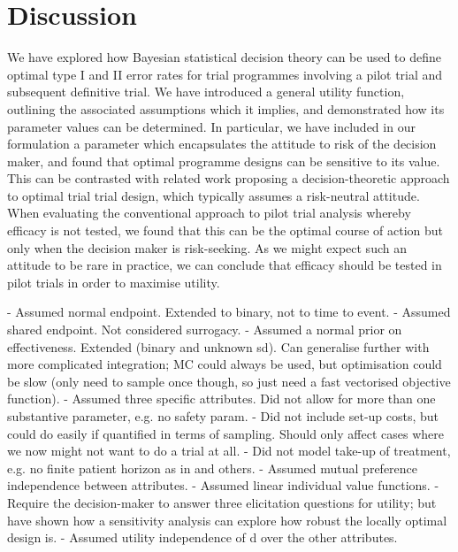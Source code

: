 \documentclass[sagev, Crown]{sagej}
\begin{document}

\section{Discussion}\label{sec:discussion}

We have explored how Bayesian statistical decision theory can be used to define optimal type I and II error rates for trial programmes involving a pilot trial and subsequent definitive trial. We have introduced a general utility function, outlining the associated assumptions which it implies, and demonstrated how its parameter values can be determined. In particular, we have included in our formulation a parameter which encapsulates the attitude to risk of the decision maker, and found that optimal programme designs can be sensitive to its value. This can be contrasted with related work proposing a decision-theoretic approach to optimal trial trial design, which typically assumes a risk-neutral attitude. When evaluating the conventional approach to pilot trial analysis whereby efficacy is not tested, we found that this can be the optimal course of action but only when the decision maker is risk-seeking. As we might expect such an attitude to be rare in practice, we can conclude that efficacy should be tested in pilot trials in order to maximise utility.

- Assumed normal endpoint. Extended to binary, not to time to event.
- Assumed shared endpoint. Not considered surrogacy.
- Assumed a normal prior on effectiveness. Extended (binary and unknown sd). Can generalise further with more complicated integration; MC could always be used, but optimisation could be slow (only need to sample once though, so just need a fast vectorised objective function).
- Assumed three specific attributes.  Did not allow for more than one substantive parameter, e.g. no safety param. 
- Did not include set-up costs, but could do easily if quantified in terms of sampling. Should only affect cases where we now might not want to do a trial at all.
- Did not model take-up of treatment, e.g. no finite patient horizon as in \cite{Pearce2018} and others. 
- Assumed mutual preference independence between attributes. 
- Assumed linear individual value functions.
- Require the decision-maker to answer three elicitation questions for utility; but have shown how a sensitivity analysis can explore how robust the locally optimal design is.
- Assumed utility independence of d over the other attributes.
\end{document}
